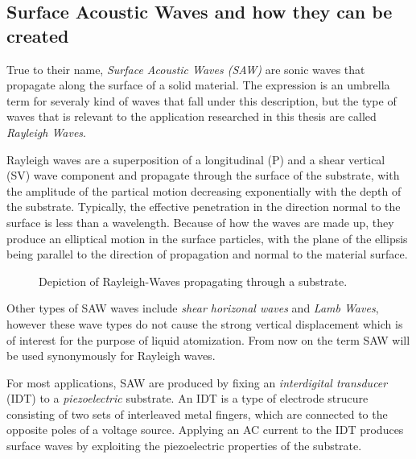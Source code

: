\subsection{Surface Acoustic Waves and how they can be created}

True to their name, \emph{Surface Acoustic Waves (SAW)} are sonic waves that propagate along the surface of a solid material. 
The expression is an umbrella term for severaly kind of waves that fall under this description, but the type of waves that is relevant to the application researched in this thesis are called \emph{Rayleigh Waves}. \cite{mandalSurfaceAcousticWave2022}

Rayleigh waves are a superposition of a longitudinal (P) and a shear vertical (SV) wave component and propagate through the surface of the substrate, with the amplitude of the partical motion decreasing exponentially with the depth of the substrate. 
Typically, the effective penetration in the direction normal to the surface is less than a wavelength. 
Because of how the waves are made up, they produce an elliptical motion in the surface particles, with the plane of the ellipsis being parallel to the direction of propagation and normal to the material surface.

\begin{figure}[htbp]
    \centering
    \caption{Depiction of Rayleigh-Waves propagating through a substrate. \cite{mandalSurfaceAcousticWave2022}}
    \label{fig:rayleigh}
\end{figure}

Other types of SAW waves include \emph{shear horizonal waves} and \emph{Lamb Waves}, however these wave types do not cause the strong vertical displacement which is of interest for the purpose of liquid atomization. From now on the term SAW will be used synonymously for Rayleigh waves.

For most applications, SAW are produced by fixing an \emph{interdigital transducer} (IDT) to a \emph{piezoelectric} substrate. An IDT is a type of electrode strucure consisting of two sets of interleaved metal fingers, which are connected to the opposite poles of a voltage source. Applying an AC current to the IDT produces surface waves by exploiting the piezoelectric properties of the substrate.

